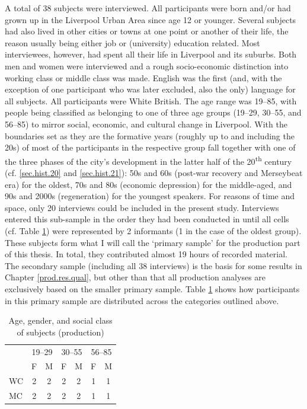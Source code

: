 A total of 38 subjects were interviewed.
All participants were born and/or had grown up in the Liverpool Urban Area since age 12 or younger.
Several subjects had also lived in other cities or towns at one point or another of their life, the reason usually being either job or (university) education related.
Most interviewees, however, had spent all their life in Liverpool and its suburbs.
Both men and women were interviewed and a rough socio-economic distinction into working class or middle class was made.
English was the first (and, with the exception of one participant who was later excluded, also the only) language for all subjects.
All participants were White British.
The age range was 19--85, with people being classified as belonging to one of three age groups (19--29, 30--55, and 56--85) to mirror social, economic, and cultural change in Liverpool.
With the boundaries set as they are the formative years (roughly up to and including the 20s) of most of the participants in the respective group fall together with one of the three phases of the city's development in the latter half of the 20\textsuperscript{th} century (cf. \ref{sec.hist.20} and \ref{sec.hist.21}): 50s and 60s (post-war recovery and Merseybeat era) for the oldest, 70s and 80s (economic depression) for the middle-aged, and 90s and 2000s (regeneration) for the youngest speakers.
For reasons of time and space, only 20 interviews could be included in the present study.
Interviews entered this sub-sample in the order they had been conducted in until all cells (cf. Table \ref{tab.participants}) were represented by 2 informants (1 in the case of the oldest group).
These subjects form what I will call the `primary sample' for the production part of this thesis.
In total, they contributed almost 19 hours of recorded material.
The secondary sample (including all 38 interviews) is the basis for some results in Chapter \ref{prod.res.qual}, but other than that all production analyses are exclusively based on the smaller primary sample.
Table \ref{tab.participants} shows how participants in this primary sample are distributed across the categories outlined above.

	\begin{table}[h]
		\centering
		\caption{Age, gender, and social class of subjects (production)}
		\label{tab.participants}
		\begin{tabular}{lcccccc}
			\hline
			& \multicolumn{2}{c}{19--29} & \multicolumn{2}{c}{30--55} & \multicolumn{2}{c}{56--85}\\
			& F & M & F & M & F & M\\
			\hline
			WC & 2 & 2 & 2 & 2 & 1 & 1\\
			MC & 2 & 2 & 2 & 2 & 1 & 1\\
			\hline
		\end{tabular}
	\end{table}

